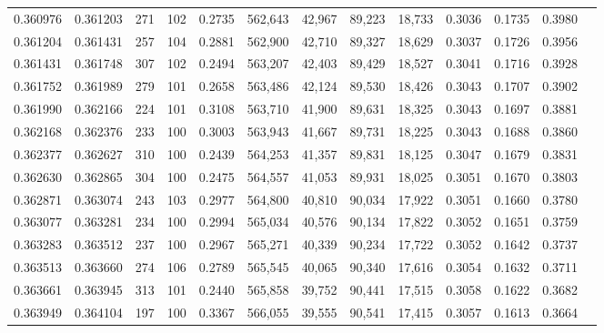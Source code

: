 \begin{tabular}{rrrrrrrrrrrrr}
0.360976 & 0.361203 &   271 & 102 &                                     0.2735 & 562,643 &  42,967 &  89,223 &  18,733 & 0.3036 & 0.1735 & 0.3980 \\
0.361204 & 0.361431 &   257 & 104 &                                     0.2881 & 562,900 &  42,710 &  89,327 &  18,629 & 0.3037 & 0.1726 & 0.3956 \\
0.361431 & 0.361748 &   307 & 102 &                                     0.2494 & 563,207 &  42,403 &  89,429 &  18,527 & 0.3041 & 0.1716 & 0.3928 \\
0.361752 & 0.361989 &   279 & 101 &                                     0.2658 & 563,486 &  42,124 &  89,530 &  18,426 & 0.3043 & 0.1707 & 0.3902 \\
0.361990 & 0.362166 &   224 & 101 &                                     0.3108 & 563,710 &  41,900 &  89,631 &  18,325 & 0.3043 & 0.1697 & 0.3881 \\
0.362168 & 0.362376 &   233 & 100 &                                     0.3003 & 563,943 &  41,667 &  89,731 &  18,225 & 0.3043 & 0.1688 & 0.3860 \\
0.362377 & 0.362627 &   310 & 100 &                                     0.2439 & 564,253 &  41,357 &  89,831 &  18,125 & 0.3047 & 0.1679 & 0.3831 \\
0.362630 & 0.362865 &   304 & 100 &                                     0.2475 & 564,557 &  41,053 &  89,931 &  18,025 & 0.3051 & 0.1670 & 0.3803 \\
0.362871 & 0.363074 &   243 & 103 &                                     0.2977 & 564,800 &  40,810 &  90,034 &  17,922 & 0.3051 & 0.1660 & 0.3780 \\
0.363077 & 0.363281 &   234 & 100 &                                     0.2994 & 565,034 &  40,576 &  90,134 &  17,822 & 0.3052 & 0.1651 & 0.3759 \\
0.363283 & 0.363512 &   237 & 100 &                                     0.2967 & 565,271 &  40,339 &  90,234 &  17,722 & 0.3052 & 0.1642 & 0.3737 \\
0.363513 & 0.363660 &   274 & 106 &                                     0.2789 & 565,545 &  40,065 &  90,340 &  17,616 & 0.3054 & 0.1632 & 0.3711 \\
0.363661 & 0.363945 &   313 & 101 &                                     0.2440 & 565,858 &  39,752 &  90,441 &  17,515 & 0.3058 & 0.1622 & 0.3682 \\
0.363949 & 0.364104 &   197 & 100 &                                     0.3367 & 566,055 &  39,555 &  90,541 &  17,415 & 0.3057 & 0.1613 & 0.3664 \\

\end{tabular}
